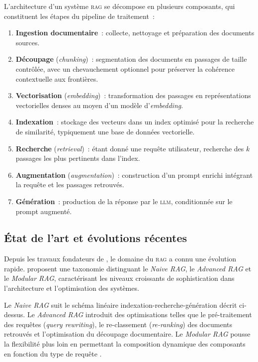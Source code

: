 \documentclass[12pt,a4paper,oneside]{report}
\newcommand{\rag}{\textsc{rag}}
\newcommand{\llm}{\textsc{llm}}
\begin{document}
L'architecture d'un système \rag{} se décompose en plusieurs composants, qui constituent les étapes du pipeline de traitement~:

\begin{enumerate}
  \item \textbf{Ingestion documentaire}~: collecte, nettoyage et préparation des documents sources.
  \item \textbf{Découpage} (\textit{chunking})~: segmentation des documents en passages de taille contrôlée, avec un chevauchement optionnel pour préserver la cohérence contextuelle aux frontières.
  \item \textbf{Vectorisation} (\textit{embedding})~: transformation des passages en représentations vectorielles denses au moyen d'un modèle d'\textit{embedding}.
  \item \textbf{Indexation}~: stockage des vecteurs dans un index optimisé pour la recherche de similarité, typiquement une base de données vectorielle.
  \item \textbf{Recherche} (\textit{retrieval})~: étant donné une requête utilisateur, recherche des $k$ passages les plus pertinents dans l'index.
  \item \textbf{Augmentation} (\textit{augmentation})~: construction d'un prompt enrichi intégrant la requête et les passages retrouvés.
  \item \textbf{Génération}~: production de la réponse par le \llm{}, conditionnée sur le prompt augmenté.
\end{enumerate}

\subsection{État de l'art et évolutions récentes}

Depuis les travaux fondateurs de \citet{lewis2020}, le domaine du \rag{} a connu une évolution rapide. \citet{gao2024} proposent une taxonomie distinguant le \textit{Naive RAG}, le \textit{Advanced RAG} et le \textit{Modular RAG}, caractérisant les niveaux croissants de sophistication dans l'architecture et l'optimisation des systèmes.

Le \textit{Naive RAG} suit le schéma linéaire indexation-recherche-génération décrit ci-dessus. Le \textit{Advanced RAG} introduit des optimisations telles que le pré-traitement des requêtes (\textit{query rewriting}), le re-classement (\textit{re-ranking}) des documents retrouvés et l'optimisation du découpage documentaire. Le \textit{Modular RAG} pousse la flexibilité plus loin en permettant la composition dynamique des composants en fonction du type de requête \citep{gao2024}.
\end{document}
